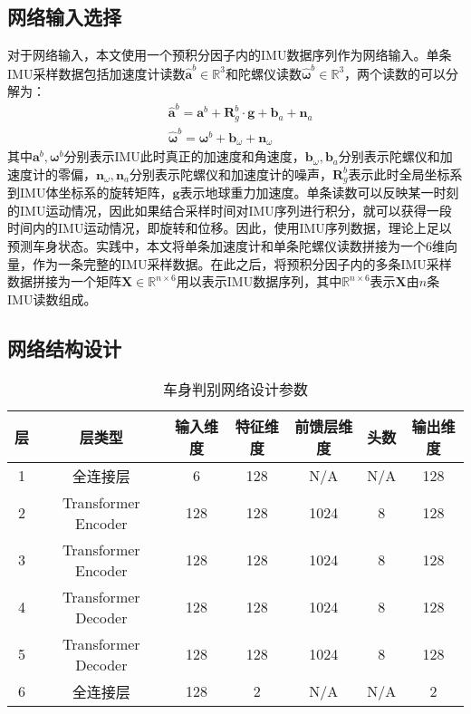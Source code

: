 \subsection{网络输入选择}
对于网络输入，本文使用一个预积分因子内的IMU数据序列作为网络输入。单条IMU采样数据包括加速度计读数$\hat{\symbf{a}}^b \in \mathbb{R}^3$和陀螺仪读数$\hat{\symbf{\omega}}^b \in \mathbb{R}^3$，两个读数的可以分解为：
\begin{equation}
\begin{aligned}
  &\hat{\symbf{a}}^b = \symbf{a}^b + \symbf{R}^{b}_{g}\cdot \symbf{g} + \symbf{b}_{a} + \symbf{n}_{a} \\
  &\hat{\symbf{\omega}}^b = \symbf{\omega}^b + \symbf{b}_{\omega} + \symbf{n}_{\omega} 
\end{aligned}
\end{equation}
其中$\symbf{a}^b, \symbf{\omega}^b$分别表示IMU此时真正的加速度和角速度，$\symbf{b}_{\omega}, \symbf{b}_{a}$分别表示陀螺仪和加速度计的零偏，$\symbf{n}_{\omega}, \symbf{n}_{a}$分别表示陀螺仪和加速度计的噪声，$\symbf{R}^{b}_{g}$表示此时全局坐标系到IMU体坐标系的旋转矩阵，$\symbf{g}$表示地球重力加速度。单条读数可以反映某一时刻的IMU运动情况，因此如果结合采样时间对IMU序列进行积分，就可以获得一段时间内的IMU运动情况，即旋转和位移。因此，使用IMU序列数据，理论上足以预测车身状态。实践中，本文将单条加速度计和单条陀螺仪读数拼接为一个6维向量，作为一条完整的IMU采样数据。在此之后，将预积分因子内的多条IMU采样数据拼接为一个矩阵$\symbf{X}\in \mathbb{R}^{n \times 6}$用以表示IMU数据序列，其中$\mathbb{R}^{n \times 6}$表示$\symbf{X}$由$n$条IMU读数组成。

\subsection{网络结构设计}
\begin{table}
  \centering
  \caption{车身判别网络设计参数}
  \begin{tabular}{ccccccc}
  \toprule
  层 & 层类型                 & 输入维度 & 特征维度 & 前馈层维度 & 头数 & 输出维度 \\
  \midrule
  1 & 全连接层                & 6    & 128  & N/A   & N/A & 128 \\
  2 & Transformer Encoder & 128  & 128  & 1024  & 8 & 128  \\
  3 & Transformer Encoder & 128  & 128  & 1024  & 8 & 128  \\
  4 & Transformer Decoder & 128  & 128  & 1024  & 8 & 128  \\
  5 & Transformer Decoder & 128  & 128  & 1024  & 8 & 128  \\
  6 & 全连接层                & 128  & 2    & N/A   & N/A & 2 \\
  \bottomrule
  \end{tabular}
  \label{tab:network}
\end{table}

